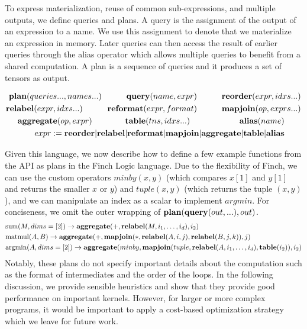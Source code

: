 To express materialization, reuse of common sub-expressions, and multiple outputs, we define queries and plans. A query is the assignment of the output of an expression to a name. We use this assignment to denote that we materialize an expression in memory. Later queries can then access the result of earlier queries through the alias operator which allows multiple queries to benefit from a shared computation. A plan is a sequence of queries and it produces a set of tensors as output. 

\begin{align*}
    \text{\textbf{plan}}(queries..., names...) \quad\quad\quad \text{\textbf{query}}(name, expr) \quad\quad\quad \text{\textbf{reorder}}(expr, idxs...)\\
     \text{\textbf{relabel}}(expr, idxs...) \quad\quad\quad \text{\textbf{reformat}}(expr, format) \quad\quad\quad \text{\textbf{mapjoin}}(op, exprs...) \\
    \text{\textbf{aggregate}}(op, expr)\quad\quad\quad\quad \text{\textbf{table}}(tns, idxs...)  \quad\quad\quad\quad\quad\quad \text{\textbf{alias}}(name) \quad\quad\\
     expr:= \text{\textbf{reorder}} | \text{\textbf{relabel}} | \text{\textbf{reformat}} |\text{\textbf{mapjoin}} | \text{\textbf{aggregate}} | \text{\textbf{table}} | \text{\textbf{alias}} \quad\quad
\end{align*}

Given this language, we now describe how to define a few example functions from the API as plans in the Finch Logic language. Due to the flexibility of Finch, we can use the custom operators $minby(x,y)$ (which compares $x[1]$ and $y[1]$ and returns the smaller $x$ or $y$) and $tuple(x, y)$ (which returns the tuple $(x,y)$), and we can manipulate an index as a scalar to implement $argmin$. For conciseness, we omit the outer wrapping of $\text{\textbf{plan}}(\text{\textbf{query}}(out,...),out)$.
\begin{align*}
&\text{sum}(M, dims=[2]) \rightarrow \text{\textbf{aggregate}}(+,\text{\textbf{relabel}}(M, i_1,\ldots,i_d), i_2)\\
&\text{matmul}(A, B) \rightarrow \text{\textbf{aggregate}}(+,\text{\textbf{mapjoin}}(*, \text{\textbf{relabel}}(A, i, j), \text{\textbf{relabel}}(B, j, k)), j)\\
&\text{argmin}(A, dims=[2]) \rightarrow \text{\textbf{aggregate}}(minby,\text{\textbf{mapjoin}}(tuple, \text{\textbf{relabel}}(A, i_1,\ldots,i_d), \text{\textbf{table}}(i_2)), i_2)
\end{align*}
Notably, these plans do not specify important details about the computation such as the format of intermediates and the order of the loops. In the following discussion, we provide sensible heuristics and show that they provide good performance on important kernels. However, for larger or more complex programs, it would be important to apply a cost-based optimization strategy which we leave for future work.

